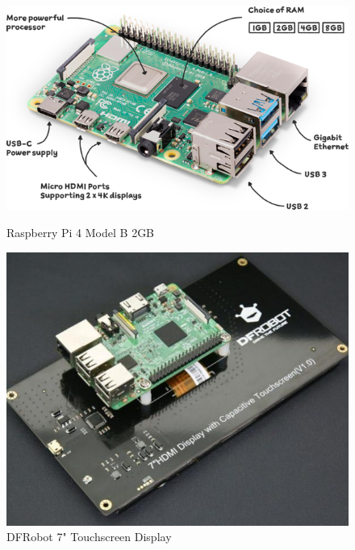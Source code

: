 \begin{figure}[t]
  \begin{minipage}[t]{0.22\textwidth}
    \centering
    \includegraphics[width=\textwidth]{imgs/pi4_labelled.png}
    \caption{Raspberry Pi 4 Model B 2GB\cite{pi4}}
  \end{minipage}
  \hfill
  \begin{minipage}[t]{0.22\textwidth}
    \centering
    \includegraphics[width=\textwidth]{imgs/dfrobot_screen.jpg}
    \caption{DFRobot 7" Touchscreen Display\cite{7inchdisplay}}
  \end{minipage}
  \hfill
  \begin{minipage}[t]{0.22\textwidth}
      \centering

\end{minipage}
\end{figure}
